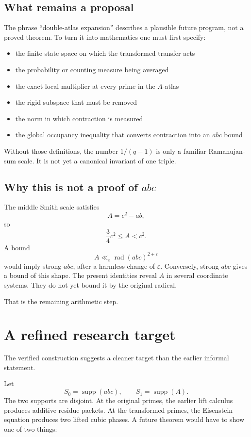 \documentclass[11pt]{article}
\newcommand{\rad}{\operatorname{rad}}
\begin{document}
\subsection{What remains a proposal}

The phrase ``double-atlas expansion'' describes a plausible future program, not a proved theorem.  To turn it into mathematics one must first specify:

\begin{itemize}
  \item the finite state space on which the transformed transfer acts
  \item the probability or counting measure being averaged
  \item the exact local multiplier at every prime in the $A$-atlas
  \item the rigid subspace that must be removed
  \item the norm in which contraction is measured
  \item the global occupancy inequality that converts contraction into an $abc$ bound
\end{itemize}

Without those definitions, the number $1/(q-1)$ is only a familiar Ramanujan-sum scale.  It is not yet a canonical invariant of one triple.

\subsection{Why this is not a proof of \texorpdfstring{$abc$}{abc}}

The middle Smith scale satisfies
\[
  A=c^2-ab,
\]
so
\[
  \frac34c^2\leq A<c^2.
\]
A bound
\[
  A\ll_\varepsilon\rad(abc)^{2+\varepsilon}
\]
would imply strong $abc$, after a harmless change of $\varepsilon$.  Conversely, strong $abc$ gives a bound of this shape.  The present identities reveal $A$ in several coordinate systems.  They do not yet bound it by the original radical.

That is the remaining arithmetic step.

\section{A refined research target}

The verified construction suggests a cleaner target than the earlier informal statement.

Let
\[
  S_0=\operatorname{supp}(abc),
  \qquad
  S_1=\operatorname{supp}(A).
\]
The two supports are disjoint.  At the original primes, the earlier lift calculus produces additive residue packets.  At the transformed primes, the Eisenstein equation produces two lifted cubic phases.  A future theorem would have to show one of two things:
\end{document}
